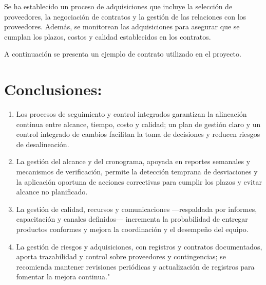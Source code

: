     Se ha establecido un proceso de adquisiciones que incluye la selección de proveedores, la negociación de contratos y la gestión de las relaciones con los proveedores. Además, se monitorean las adquisiciones para asegurar que se cumplan los plazos, costos y calidad establecidos en los contratos.

A continuación se presenta un ejemplo de contrato utilizado en el proyecto.



\section{Conclusiones:}

\begin{enumerate}
  \item Los procesos de seguimiento y control integrados garantizan la alineación continua entre alcance, tiempo, costo y calidad; un plan de gestión claro y un control integrado de cambios facilitan la toma de decisiones y reducen riesgos de desalineación.
  \item La gestión del alcance y del cronograma, apoyada en reportes semanales y mecanismos de verificación, permite la detección temprana de desviaciones y la aplicación oportuna de acciones correctivas para cumplir los plazos y evitar alcance no planificado.
  \item La gestión de calidad, recursos y comunicaciones —respaldada por informes, capacitación y canales definidos— incrementa la probabilidad de entregar productos conformes y mejora la coordinación y el desempeño del equipo.
  \item La gestión de riesgos y adquisiciones, con registros y contratos documentados, aporta trazabilidad y control sobre proveedores y contingencias; se recomienda mantener revisiones periódicas y actualización de registros para fomentar la mejora continua."
\end{enumerate}